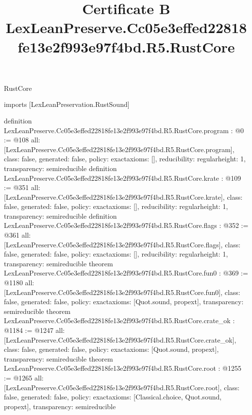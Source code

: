 \begin{lexlean}{RustCore}
\title{Certificate B LexLeanPreserve.Cc05e3effed22818fe13e2f993e97f4bd.R5.RustCore}
\begin{coremodule}
imports [LexLeanPreservation.RustSound]

definition LexLeanPreserve.Cc05e3effed22818fe13e2f993e97f4bd.R5.RustCore.program : @0 := @108 {
  all: [LexLeanPreserve.Cc05e3effed22818fe13e2f993e97f4bd.R5.RustCore.program],
  class: false,
  generated: false,
  policy: exact{axioms: []},
  reducibility: regular{height: 1},
  transparency: semireducible
}
definition LexLeanPreserve.Cc05e3effed22818fe13e2f993e97f4bd.R5.RustCore.krate : @109 := @351 {
  all: [LexLeanPreserve.Cc05e3effed22818fe13e2f993e97f4bd.R5.RustCore.krate],
  class: false,
  generated: false,
  policy: exact{axioms: []},
  reducibility: regular{height: 1},
  transparency: semireducible
}
definition LexLeanPreserve.Cc05e3effed22818fe13e2f993e97f4bd.R5.RustCore.flags : @352 := @361 {
  all: [LexLeanPreserve.Cc05e3effed22818fe13e2f993e97f4bd.R5.RustCore.flags],
  class: false,
  generated: false,
  policy: exact{axioms: []},
  reducibility: regular{height: 1},
  transparency: semireducible
}
theorem LexLeanPreserve.Cc05e3effed22818fe13e2f993e97f4bd.R5.RustCore.fun0 : @369 := @1180 {
  all: [LexLeanPreserve.Cc05e3effed22818fe13e2f993e97f4bd.R5.RustCore.fun0],
  class: false,
  generated: false,
  policy: exact{axioms: [Quot.sound, propext]},
  transparency: semireducible
}
theorem LexLeanPreserve.Cc05e3effed22818fe13e2f993e97f4bd.R5.RustCore.crate_ok : @1184 := @1247 {
  all: [LexLeanPreserve.Cc05e3effed22818fe13e2f993e97f4bd.R5.RustCore.crate_ok],
  class: false,
  generated: false,
  policy: exact{axioms: [Quot.sound, propext]},
  transparency: semireducible
}
theorem LexLeanPreserve.Cc05e3effed22818fe13e2f993e97f4bd.R5.RustCore.root : @1255 := @1265 {
  all: [LexLeanPreserve.Cc05e3effed22818fe13e2f993e97f4bd.R5.RustCore.root],
  class: false,
  generated: false,
  policy: exact{axioms: [Classical.choice, Quot.sound, propext]},
  transparency: semireducible
}


\end{coremodule}
\end{lexlean}
